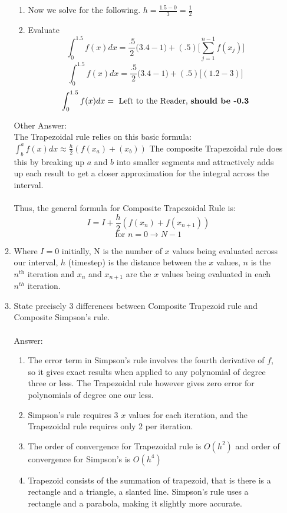 \documentclass{article}
\begin{document}
\begin{enumerate}
\begin{enumerate}
\begin{enumerate}
                \item Now we solve for the following. $h = \frac{1.5 - 0}{3} = \frac{1}{2}$
                \item Evaluate
                 $$\int_{0}^{1.5}f(x)dx = \frac{.5}{2}\Big(3.4 - 1\Big) + (.5)\Big[\sum_{j = 1}^{n - 1}f(x_j)\Big]$$
                 $$\int_{0}^{1.5}f(x)dx = \frac{.5}{2}\Big(3.4 - 1\Big) + (.5)\Big[(1.2 - 3)\Big]$$
                 $$\int_{0}^{1.5}f(x)dx = \text{ Left to the Reader, \textbf{should be -0.3}}$$
                 
            \end{enumerate}
            Other Answer:\\
            The Trapezoidal rule relies on this basic formula:
            $\int_{b}^{a}f(x)dx \approx \frac{h}{2}(f(x_a)+(x_b))$
            The composite Trapezoidal rule does this by breaking up $a$ and $b$ into smaller segments and attractively adds up each result to get a closer approximation for the integral across the interval.\\
            \\
            Thus, the general formula for Composite Trapezoidal Rule is:
            $$ I = I + \frac{h}{2}(f(x_n) + f(x_{n+1})) $$
            $$\text{for }n = 0\rightarrow N-1$$
            \item Where $I = 0$ initially, N is the number of $x$ values being evaluated across our interval, $h$ (timestep) is the distance between the $x$ values, $n$ is the $n^{\text{th}}$ iteration and $x_n$ and $x_{n+1}$ are the $x$ values being evaluated in each $n^{th}$ iteration.
        \color{black}
        
        \item State precisely $3$ differences between Composite Trapezoid rule and Composite Simpson’s rule.\\
        \\
        \color{red}
            Answer:\\
            \begin{enumerate}
            \item The error term in Simpson’s rule involves the fourth derivative of $f$, so it gives exact results when applied to any polynomial of degree three or less. The Trapezoidal rule however gives zero error for polynomials of degree one our less.
            \item Simpson's rule requires 3 $x$ values for each iteration, and the Trapezoidal rule requires only 2 per iteration.
            \item The order of convergence for Trapezoidal rule is $O(h^2)$ and order of convergence for Simpson's is $O(h^4)$
            \item  Trapezoid consists of the summation of trapezoid, that is there is a rectangle and a triangle, a slanted line. Simpson’s rule uses a rectangle and a parabola, making it slightly more accurate.
            \end{enumerate}
        \color{black}
        

\end{enumerate}
\end{enumerate}
\end{document}
